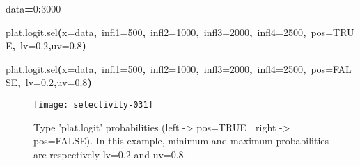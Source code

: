 \documentclass[letterpaper, 12pt]{article}
\newenvironment{Hinput}%
{}%
{}%
\newenvironment{Hchunk}%
{\vspace{0.5em}\par\begin{flushleft}}%
{\end{flushleft}}%
\newcommand{\hlnumber}[1]{\textcolor[rgb]{0.0823529411764706,0.0784313725490196,0.709803921568627}{#1}}%
\newcommand{\hlfunctioncall}[1]{\textcolor[rgb]{1,0,0}{#1}}%
\newcommand{\hlkeyword}[1]{\textcolor[rgb]{0,0,0}{\textbf{#1}}}%
\newcommand{\hlargument}[1]{\textcolor[rgb]{0.694117647058824,0.247058823529412,0.0196078431372549}{#1}}%
\newcommand{\hlassignement}[1]{\textcolor[rgb]{0.215686274509804,0.215686274509804,0.384313725490196}{\textbf{#1}}}%
\newcommand{\hlsymbol}[1]{\textcolor[rgb]{0,0,0}{#1}}%
\newcommand{\hlprompt}[1]{\textcolor[rgb]{0,0,0}{#1}}%
\begin{document}
\begin{Hchunk}
\begin{normalsize}
\begin{Hinput}
\ttfamily\noindent
\hlprompt{\usebox{\hlnormalsizeboxgreaterthan}{\ }}\hlsymbol{data}\hlassignement{=}\hlnumber{0}\hlkeyword{:}\hlnumber{3000}\mbox{}
\normalfont
\end{Hinput}


\begin{Hinput}
\ttfamily\noindent
\hlprompt{\usebox{\hlnormalsizeboxgreaterthan}{\ }}\hlfunctioncall{plat.logit.sel}\hlkeyword{(}\hlargument{x}\hlargument{=}\hlsymbol{data}\hlkeyword{,}{\ }\hlargument{infl1}\hlargument{=}\hlnumber{500}\hlkeyword{,}{\ }\hlargument{infl2}\hlargument{=}\hlnumber{1000}\hlkeyword{,}{\ }\hlargument{infl3}\hlargument{=}\hlnumber{2000}\hlkeyword{,}{\ }\hlargument{infl4}\hlargument{=}\hlnumber{2500}\hlkeyword{,}{\ }\hlargument{pos}\hlargument{=}\hlnumber{TRUE}\hlkeyword{,}{\ }\hlargument{lv}\hlargument{=}\hlnumber{0.2}\hlkeyword{,}\hlargument{uv}\hlargument{=}\hlnumber{0.8}\hlkeyword{)}\mbox{}
\normalfont
\end{Hinput}


\begin{Hinput}
\ttfamily\noindent
\hlprompt{\usebox{\hlnormalsizeboxgreaterthan}{\ }}\hlfunctioncall{plat.logit.sel}\hlkeyword{(}\hlargument{x}\hlargument{=}\hlsymbol{data}\hlkeyword{,}{\ }\hlargument{infl1}\hlargument{=}\hlnumber{500}\hlkeyword{,}{\ }\hlargument{infl2}\hlargument{=}\hlnumber{1000}\hlkeyword{,}{\ }\hlargument{infl3}\hlargument{=}\hlnumber{2000}\hlkeyword{,}{\ }\hlargument{infl4}\hlargument{=}\hlnumber{2500}\hlkeyword{,}{\ }\hlargument{pos}\hlargument{=}\hlnumber{FALSE}\hlkeyword{,}{\ }\hlargument{lv}\hlargument{=}\hlnumber{0.2}\hlkeyword{,}\hlargument{uv}\hlargument{=}\hlnumber{0.8}\hlkeyword{)}\mbox{}
\normalfont
\end{Hinput}


\end{normalsize}
\end{Hchunk}

\begin{figure}[h]
\vspace{-20pt}
\begin{center}
\texttt{[image: selectivity-031]}
\end{center}
\vspace{-30pt}
\caption{Type 'plat.logit' probabilities (left -> pos=TRUE |  right -> pos=FALSE). In this example, minimum and maximum probabilities are respectively lv=0.2 and uv=0.8.}
\vspace{-20pt}
\label{fig15}
\end{figure}
\end{document}
